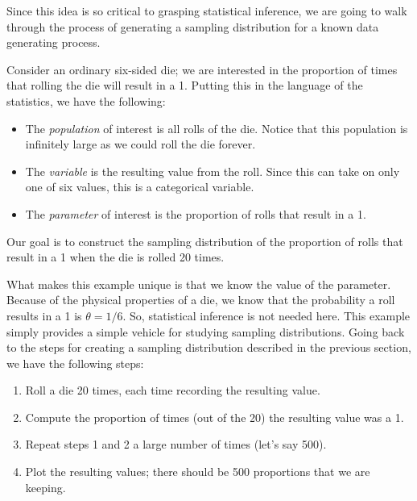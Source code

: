\documentclass[]{book}
\providecommand{\tightlist}{%
  \setlength{\itemsep}{0pt}\setlength{\parskip}{0pt}}
\theoremstyle{definition}
\theoremstyle{definition}
\theoremstyle{definition}
\theoremstyle{remark}
\let\BeginKnitrBlock\begin \let\EndKnitrBlock\end
\begin{document}
Since this idea is so critical to grasping statistical inference, we are
going to walk through the process of generating a sampling distribution
for a known data generating process.

\BeginKnitrBlock{example}[Dice Experiment]
\protect\hypertarget{exm:samplingdistns-dice}{}{\label{exm:samplingdistns-dice}
{} }Consider an ordinary six-sided die; we
are interested in the proportion of times that rolling the die will
result in a 1. Putting this in the language of the statistics, we have
the following:

\begin{itemize}
\tightlist
\item
  The \emph{population} of interest is all rolls of the die. Notice that
  this population is infinitely large as we could roll the die forever.
\item
  The \emph{variable} is the resulting value from the roll. Since this
  can take on only one of six values, this is a categorical variable.
\item
  The \emph{parameter} of interest is the proportion of rolls that
  result in a 1.
\end{itemize}

Our goal is to construct the sampling distribution of the proportion of
rolls that result in a 1 when the die is rolled 20 times.
\EndKnitrBlock{example}

What makes this example unique is that we know the value of the
parameter. Because of the physical properties of a die, we know that the
probability a roll results in a 1 is \(\theta = 1/6\). So, statistical
inference is not needed here. This example simply provides a simple
vehicle for studying sampling distributions. Going back to the steps for
creating a sampling distribution described in the previous section, we
have the following steps:

\begin{enumerate}
\def\labelenumi{\arabic{enumi}.}
\tightlist
\item
  Roll a die 20 times, each time recording the resulting value.
\item
  Compute the proportion of times (out of the 20) the resulting value
  was a 1.
\item
  Repeat steps 1 and 2 a large number of times (let's say 500).
\item
  Plot the resulting values; there should be 500 proportions that we are
  keeping.
\end{enumerate}
\end{document}
